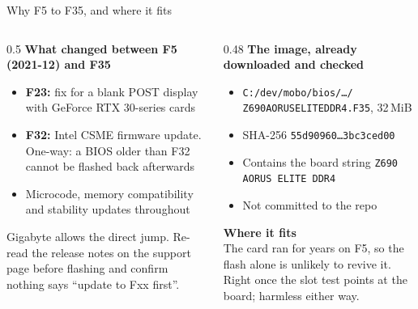 \documentclass[aspectratio=169,11pt]{beamer}
\begin{document}
\begin{frame}{Why F5 to F35, and where it fits}
  \begin{columns}[T,onlytextwidth]
    \begin{column}{0.5\textwidth}
      \footnotesize
      \textbf{What changed between F5 (2021-12) and F35}
      \begin{itemize}\setlength{\itemsep}{0.3em}
        \item \textbf{F23:} fix for a blank POST display with GeForce RTX 30-series cards
        \item \textbf{F32:} Intel CSME firmware update. One-way: a BIOS older than F32 cannot be
          flashed back afterwards
        \item Microcode, memory compatibility and stability updates throughout
      \end{itemize}
      \medskip
      Gigabyte allows the direct jump. Re-read the release notes on the support page before
      flashing and confirm nothing says ``update to Fxx first''.
    \end{column}
    \begin{column}{0.48\textwidth}
      \footnotesize
      \textbf{The image, already downloaded and checked}
      \begin{itemize}\setlength{\itemsep}{0.3em}
        \item \texttt{C:/dev/mobo/bios/\ldots/}\\\texttt{Z690AORUSELITEDDR4.F35}, 32\,MiB
        \item SHA-256 \texttt{55d90960\ldots{}3bc3ced00}
        \item Contains the board string \texttt{Z690 AORUS ELITE DDR4}
        \item Not committed to the repo
      \end{itemize}
      \medskip
      \textbf{Where it fits}\\
      The card ran for years on F5, so the flash alone is unlikely to revive it. Right once the
      slot test points at the board; harmless either way.
    \end{column}
  \end{columns}
\end{frame}
\end{document}
